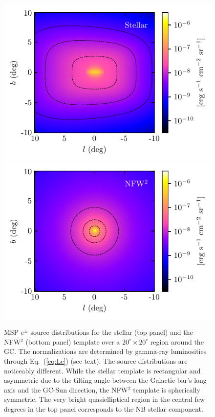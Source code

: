 \documentclass[doublespace,draft,nopageskip]{VTthesis} %
\begin{document}
\begin{figure}[t!]
  \includegraphics[width = \columnwidth]{Figures/IC_MSPs/injection_skymap_bulge.pdf}
  \includegraphics[width = \columnwidth]{Figures/IC_MSPs/injection_skymap_nfw.pdf}
  \caption{MSP $e^\pm$ source distributions for the stellar (top panel) and the NFW$^2$ (bottom panel) template over a $20^\circ \times 20^\circ$ region around the GC. The normalizations are determined by gamma-ray luminosities through Eq.~(\ref{eq:Le}) (see text).
The source distributions are noticeably different. While the stellar template is rectangular and asymmetric due to the tilting angle between the Galactic bar's long axis and the GC-Sun direction, the NFW$^2$ template is spherically symmetric. The very bright quasielliptical region in the central few degrees in the top panel corresponds to the NB stellar component.}
  \label{fig:injection_skymap}
\end{figure}
\end{document}
